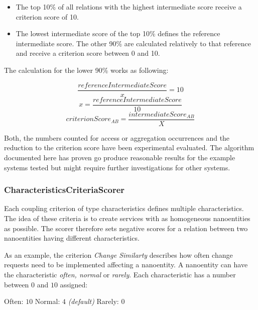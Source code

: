 \begin{itemize}
	\item The top 10\% of all relations with the highest intermediate score receive a criterion score of 10.
	\item The lowest intermediate score of the top 10\% defines the reference intermediate score. The other 90\% are calculated relatively to that reference and receive a criterion score between 0 and 10.
\end{itemize}

The calculation for the lower 90\% works as following:

\begin{equation}
\frac{referenceIntermediateScore}{x} = 10
\end{equation}
\begin{equation}
x = \frac{referenceIntermediateScore}{10}
\end{equation}
\begin{equation}
criterionScore_{AB} = \frac{intermediateScore_{AB}}{X}
\end{equation}

Both, the numbers counted for access or aggregation occurrences and the reduction to the criterion score have been experimental evaluated. The algorithm documented here has proven go produce reasonable results for the example systems tested but might require further investigations for other systems. 

\subsubsection{CharacteristicsCriteriaScorer}

Each coupling criterion of type characteristics defines multiple characteristics. The idea of these criteria is to create services with as homogeneous nanoentities as possible. The scorer therefore sets negative scores for a relation between two nanoentities having different characteristics. 

As an example, the criterion \textit{Change Similarty} describes how often change requests need to be implemented affecting a nanoentity. A nanoentity can have the characteristic \textit{often, normal} or \textit{rarely}. Each characteristic has a number between $0$ and $10$ assigned:

Often: $10$ \newline
Normal: $4$ \textit{(default)} \newline
Rarely: $0$ \newline

